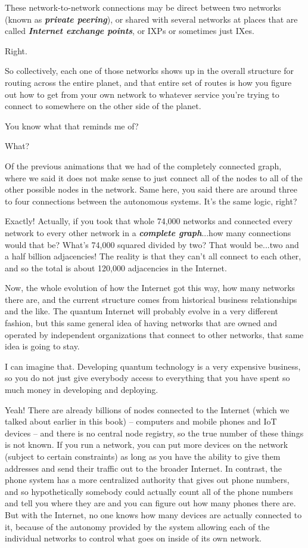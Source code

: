 These network-to-network connections may be direct between two networks (known as \textbf{\emph{private peering}}), or shared with several networks at places that are called \textbf{\emph{Internet exchange points}}, or IXPs or sometimes just IXes.

\mmm Right.

\rrr So collectively, each one of those networks shows up in the overall structure for routing across the entire planet, and that entire set of routes is how you figure out how to get from your own network to whatever service you're trying to connect to somewhere on the other side of the planet.

\mmm You know what that reminds me of? 

\rrr What?

\mmm Of the previous animations that we had of the completely connected graph, where we said it does not make sense to just connect all of the nodes to all of the other possible nodes in the network. Same here, you said there are around three to four connections between the autonomous systems. It's the same logic, right?

\rrr Exactly! Actually, if you took that whole 74,000 networks and connected every network to every other network in a \textbf{\emph{complete graph}}...how many connections would that be?  What's 74,000 squared divided by two? That would be...two and a half billion adjacencies!  The reality is that they can't all connect to each other, and so the total is about 120,000 adjacencies in the Internet.

Now, the whole evolution of how the Internet got this way, how many networks there are, and the current structure comes from historical business relationships and the like. The quantum Internet will probably evolve in a very different fashion, but this same general idea of having networks that are owned and operated by independent organizations that connect to other networks, that same idea is going to stay.

\mmm I can imagine that.
Developing quantum technology is a very expensive business, so you do not just give everybody access to everything that you have spent so much money in developing and deploying.

\rrr Yeah! There are already billions of nodes connected to the Internet (which we talked about earlier in this book) -- computers and mobile phones and IoT devices -- and there is no central node registry, so the true number of these things is not known. If you run a network, you can put more devices on the network (subject to certain constraints) as long as you have the ability to give them addresses and send their traffic out to the broader Internet. In contrast, the phone system has a more centralized authority that gives out phone numbers, and so hypothetically somebody could actually count all of the phone numbers and tell you where they are and you can figure out how many phones there are.  But with the Internet, no one knows how many devices are actually connected to it, because of the autonomy provided by the system allowing each of the individual networks to control what goes on inside of its own network.

